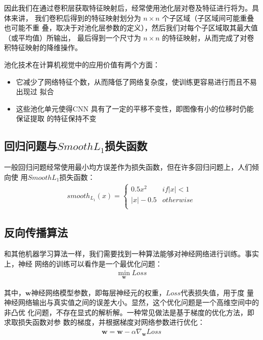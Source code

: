 因此我们在通过卷积层获取特征映射后，经常使用池化层对卷及特征进行将为。具体来讲，
我们卷积后得到的特征映射划分为 $n \times n$ 个子区域（子区域间可能重叠也可能不重
叠，取决于对池化层参数的定义），然后我们对每个子区域取其最大值（或平均值）所输出，
最后得到一个尺寸为 $n \times n$ 的特征映射，从而完成了对卷积特征映射的降维操作。

池化技术在计算机视觉中的应用价值有两个方面：

\begin{itemize}
\item 它减少了网络特征个数，从而降低了网络复杂度，使训练更容易进行而且不易出现过
  拟合
\item 这些池化单元使得CNN 具有了一定的平移不变性，即图像有小的位移时仍能保证提取
  的特征保持不变
\end{itemize}

\subsection{回归问题与$Smooth L_1$损失函数}

一般回归问题经常使用最小均方误差作为损失函数，但在许多回归问题上，人们倾向使
用$Smooth L_1$损失函数：
\begin{equation}
\begin{aligned}
smooth_{L_1}(x) = 
\begin{cases}
0.5x^2 & if |x| < 1 \\
|x| - 0.5 & otherwise \\
\end{cases}
\end{aligned}
\end{equation}

\subsection{反向传播算法}

和其他机器学习算法一样，我们需要找到一种算法能够对神经网络进行训练。事实上，神经
网络的训练可以看作是一个最优化问题：
\begin{equation}
\begin{aligned}
\min_{\mathbf{w}}{Loss}
\end{aligned}
\end{equation}

其中，$\mathbf{w}$神经网络模型参数，即每层神经元的权重，$Loss$代表损失值，用于度
量神经网络输出与真实值之间的误差大小。显然，这个优化问题是一个高维空间中的非凸优
化问题，不存在显式的解析解。一种常见做法是基于梯度的优化方法，即求取损失函数对参
数的梯度，并根据梯度对网络参数进行优化：
\begin{equation}
\begin{aligned}
\mathbf{w} = \mathbf{w} - \alpha\nabla_{\mathbf{w}}{Loss}
\end{aligned}
\end{equation}

